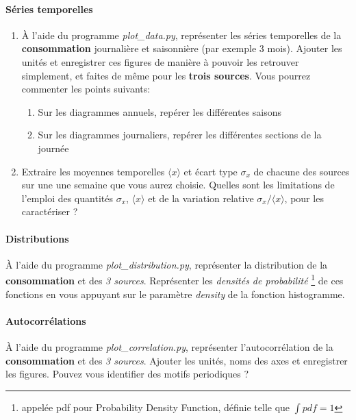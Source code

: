 \documentclass[12pt,french]{article}
\newcommand{\tmtextbf}[1]{{\bfseries{#1}}}
\newcommand{\tmtextit}[1]{{\itshape{#1}}}
\begin{document}
\paragraph{Séries temporelles}
\begin{enumerate}
  \item À l'aide du programme \tmtextit{plot\_data.py}, représenter les séries temporelles de la \tmtextbf{consommation} journalière et saisonnière (par exemple 3 mois). Ajouter les unités et enregistrer ces figures de manière à pouvoir les retrouver simplement, et faites de même pour les \textbf{trois sources}. Vous pourrez commenter les points suivants:
  \begin{enumerate}
    \item Sur les diagrammes annuels, repérer les différentes saisons
    
    \item Sur les diagrammes journaliers, repérer les différentes sections de la journée
    
  \end{enumerate}
  \item Extraire les moyennes temporelles $\langle x \rangle$ et écart type
  $\sigma_x$ de chacune des sources sur une une semaine que vous aurez choisie.
  Quelles sont les limitations de l'emploi des quantités $\sigma_x $, $ \langle
  x \rangle$ et de la variation relative $\sigma_x / \langle
  x \rangle$, pour les caractériser ?
\end{enumerate}

\paragraph{Distributions} À l'aide du programme \tmtextit{plot\_distribution.py}, représenter la distribution de la \tmtextbf{consommation} et des \textit{3 sources}. Représenter les \tmtextit{densités de probabilité} \footnote{appelée pdf pour Probability Density Function, définie telle que $\int pdf = 1$} de ces fonctions en vous appuyant sur le paramètre \tmtextit{density} de la fonction histogramme. 

\paragraph{Autocorrélations}  À l'aide du programme \tmtextit{plot\_correlation.py}, représenter l'autocorrélation de la \tmtextbf{consommation} et des \textit{3 sources}. 
Ajouter les unités, noms des axes et enregistrer les figures. Pouvez vous identifier des motifs periodiques ?
\end{document}
